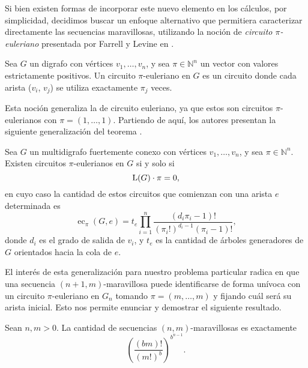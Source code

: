 Si bien existen formas de incorporar este nuevo elemento en los cálculos,
por simplicidad, decidimos buscar un enfoque alternativo que
permitiera caracterizar directamente las secuencias maravillosas, utilizando la
noción de \emph{circuito $\pi$-euleriano} presentada por Farrell y Levine en
\cite{farrell-multi-eulerian-tours}.

\begin{definition}
	Sea $G$ un digrafo con vértices $v_1, \dots, v_n$, y sea $\pi \in
		\mathbb{N}^n$
	un vector con valores estrictamente positivos.
	Un circuito $\pi$-euleriano en $G$ es un circuito donde cada arista
	($v_i$, $v_j$) se utiliza exactamente $\pi_j$ veces.
\end{definition}

Esta noción generaliza la de circuito euleriano, ya que estos son circuitos
$\pi$-eulerianos con $\pi = (1, \dots, 1)$.
Partiendo de aquí, los autores presentan la siguiente generalización del
teorema \BEST{}.

\begin{lemma*}
	\label{prop:BEST-generalized}
	Sea $G$ un multidigrafo fuertemente conexo con vértices $v_1, \dots, v_n$, y
	sea $\pi \in \mathbb{N}^n$.
	Existen circuitos $\pi$-eulerianos en $G$ si y solo si
	\[ \operatorname{L}(G) \cdot \pi = 0, \]
	en cuyo caso la cantidad de estos circuitos que comienzan con una arista $e$
	determinada es
	\[ \operatorname{ec}_\pi(G, e) = t_e
		\prod_{i=1}^n \frac{(d_i\pi_i - 1)! }{(\pi_i!)^{d_i-1}(\pi_i-1)!}, \]
	donde $d_i$ es el grado de salida de $v_i$, y $t_e$ es la cantidad de árboles
	generadores de $G$ orientados hacia la cola de $e$.
\end{lemma*}

El interés de esta generalización para nuestro problema particular radica en que
una secuencia $(n+1,m)$-maravillosa puede identificarse de forma unívoca con un
circuito $\pi$-euleriano en $G_n$ tomando $\pi = (m,\dots,m)$ y fijando cuál
será su arista inicial.
Esto nos permite enunciar y demostrar el siguiente resultado.

\begin{theorem}
	\label{theorem:marvellous-count}
	Sean $n, m > 0$.
	La cantidad de secuencias $(n,m)$-maravillosas es exactamente
	\[ \left( \frac{(bm)! }{(m!)^b} \right)^{b^{n-1}}. \]
\end{theorem}

